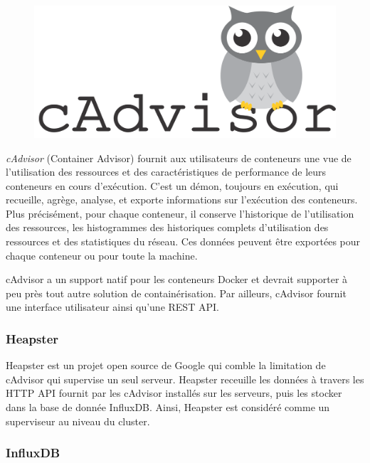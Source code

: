 \begin{onehalfspace}
\begin{figure}
\centering
\includegraphics[scale=0.2]{chapitre5/assets/cadvisor}
\end{figure}
\noindent \emph{cAdvisor} (Container Advisor) fournit aux utilisateurs de conteneurs une vue de l'utilisation des ressources et des caractéristiques de performance de leurs conteneurs en cours d'exécution. C'est un démon, toujours en exécution, qui recueille, agrège, analyse, et exporte informations sur l'exécution des conteneurs. Plus précisément, pour chaque conteneur, il conserve l'historique de l'utilisation des ressources, les histogrammes des historiques complets d'utilisation des ressources et des statistiques du réseau. Ces données peuvent être exportées pour chaque conteneur ou pour toute la machine.

cAdvisor a un support natif pour les conteneurs Docker et devrait supporter à peu près tout autre solution de containérisation. Par ailleurs, cAdvisor fournit une interface utilisateur ainsi qu'une REST API.


\subsubsection*{Heapster}

Heapster est un projet open source de Google qui comble la limitation de cAdvisor qui supervise un seul serveur. Heapster receuille les données à travers les HTTP API fournit par les cAdvisor installés sur les serveurs, puis les stocker dans la base de donnée InfluxDB. Ainsi, Heapster est considéré comme un superviseur au niveau du cluster.

\subsubsection*{InfluxDB}


\end{onehalfspace}
